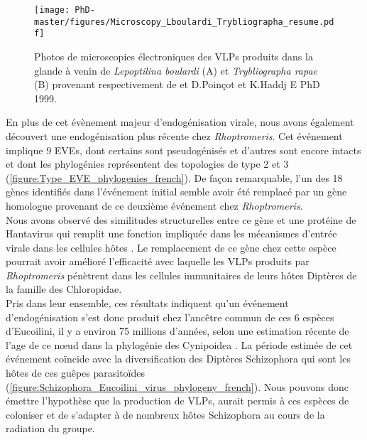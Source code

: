 \begin{figure}[H]
\texttt{[image: PhD-master/figures/Microscopy\_Lboulardi\_Trybliographa\_resume.pdf]}\centering
\caption[Paper3:[Microscopie électronique des VLPs chez \textit{L.boulardi} et \textit{T.rapae}]{Photos de microscopies électroniques des VLPs produits dans la glande à venin de \textit{Lepoptilina boulardi} (A) et \textit{Trybliographa rapae} (B) provenant respectivement de \cite{di_giovanni_behavior-manipulating_2020} et D.Poinçot et K.Haddj E PhD 1999.}
\label{figure:Microscopy_Lboulardi_Trybliographa_resume}
\end{figure}

En plus de cet évènement majeur d'endogénisation virale, nous avons également découvert une endogénisation plus récente chez \textit{Rhoptromeris}. Cet événement implique 9 EVEs, dont certains sont pseudogénisés et d'autres sont encore intacts et dont les phylogénies représentent des topologies de type 2 et 3 (\figurename{\ref{figure:Type_EVE_phylogenies_french}}). De façon remarquable, l'un des 18 gènes identifiés dans l'événement initial semble avoir été remplacé par un gène homologue provenant de ce deuxième événement chez \textit{Rhoptromeris}. \\

Nous avons observé des similitudes structurelles entre ce gène et une protéine de Hantavirus qui remplit une fonction impliquée dans les mécanismes d'entrée virale dans les cellules hôtes \citep{guardado-calvo_surface_2021}. Le remplacement de ce gène chez cette espèce pourrait avoir amélioré l'efficacité avec laquelle les VLPs produits par \textit{Rhoptromeris} pénètrent dans les cellules immunitaires de leurs hôtes Diptères de la famille des Chloropidae.\\

Pris dans leur ensemble, ces résultats indiquent qu'un événement d'endogénisation s'est donc produit chez l'ancêtre commun de ces 6 espèces d'Eucoilini, il y a environ 75 millions d'années, selon une estimation récente de l'age de ce nœud dans la phylogénie des Cynipoidea \citep{blaimer_comprehensive_2020}. La période estimée de cet événement coïncide avec la diversification des Diptères Schizophora qui sont les hôtes de ces guêpes parasitoïdes \citep{wiegmann_episodic_2011} (\figurename{\ref{figure:Schizophora_Eucoilini_virus_phylogeny_french}}). Nous pouvons donc émettre l'hypothèse que la production de VLPs, aurait permis à ces espèces de coloniser et de s'adapter à de nombreux hôtes Schizophora au cours de la radiation du groupe. \\

